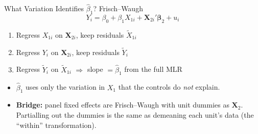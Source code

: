 \documentclass[9pt,aspectratio=169]{beamer}
\begin{document}
\begin{frame}{What Variation Identifies $\hat\beta_1$? Frisch--Waugh}
\linespread{1.2}\selectfont
  \[
    Y_i = \beta_0 + \beta_1 X_{1i} + \bm{X}_{2i}'\bm\beta_2 + u_i
  \]
  \begin{enumerate}
    \item Regress $X_{1i}$ on $\bm X_{2i}$, keep residuals $\tilde X_{1i}$
    \item Regress $Y_i$ on $\bm X_{2i}$, keep residuals $\tilde Y_i$
    \item Regress $\tilde Y_i$ on $\tilde X_{1i}$ $\Rightarrow$ slope $=\hat\beta_1$ from the full MLR
  \end{enumerate}
  \medskip
  \begin{itemize}
    \item $\hat\beta_1$ uses only the variation in $X_1$ that the controls do \emph{not} explain.
    \item \textbf{Bridge:} panel fixed effects are Frisch--Waugh with unit dummies as $\bm X_2$. Partialling out the dummies is the same as demeaning each unit's data (the ``within'' transformation).
  \end{itemize}
\end{frame}
\end{document}
